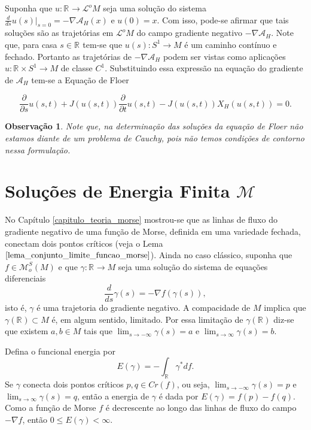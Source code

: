 \documentclass[12pt]{book}
\newtheorem{observacao}[teorema]{Observação}
\newcommand{\campohamiltoniano}[1]{X_{H}(#1)}
\newcommand{\circulo}{S^{1}}
\newcommand{\derivada}[2]{\frac{d #1}{d #2}}
\newcommand{\derivadaparcial}[2]{\frac{\partial #1}{\partial #2}}
\newcommand{\energiafinitaM}{\mathcal{M}}
\newcommand{\funcionalH}{\mathcal{A}_{H}}
\newcommand{\funcoesmorsesmale}[1]{\mathcal{M}^{S}_{o}(#1)}
\newcommand{\gradiente}{\nabla f}
\newcommand{\gradientefuncional}{\nabla \funcionalH}
\newcommand{\pontoscriticos}[1]{\textit{Cr}(#1)}
\newcommand{\retacartesianocirculo}{\real{} \times \circulo}
\newcommand{\real}[1]{\mathbb{R}^{#1}}
\newcommand{\reta}{\real{}}
\newcommand{\lacocontrateis}{\mathcal{L}^{o}M}
\begin{document}
	Suponha que $u :\reta\to \lacocontrateis$ seja uma solução do sistema $\derivada{}{s}u(s)|_{s=0} = -\gradientefuncional(x)$ e $u(0)=x$. Com isso, pode-se afirmar que tais soluções são as trajetórias em $\lacocontrateis$ do campo gradiente negativo $-\gradientefuncional$. Note que, para casa $s\in \reta$ tem-se que $u(s):\circulo\to M$ é um caminho contínuo e fechado. Portanto as trajetórias de $-\gradientefuncional$ podem ser vistas como aplicações $u:\retacartesianocirculo \to M$ de classe $C^{1}$. Substituindo essa expressão na equação do gradiente de $\funcionalH$ tem-se a Equação de Floer
	
	$$
	\derivadaparcial{}{s}u(s,t) + J(u(s,t))\derivadaparcial{}{t}u(s,t) -J(u(s,t)) \campohamiltoniano{u(s,t)}=0. 
	$$
	
	\begin{observacao}
		Note que, na determinação das soluções da equação de Floer não estamos diante de um problema de Cauchy, pois não temos condições de contorno nessa formulação.
	\end{observacao}
	
	\section{Soluções de Energia Finita $\energiafinitaM$}\label{secao_funcional_energia}
	
	No Capítulo \ref{capitulo_teoria_morse} mostrou-se que as linhas de fluxo do gradiente negativo de uma função de Morse, definida em uma variedade fechada, conectam dois pontos críticos (veja o Lema $\ref{lema_conjunto_limite_funcao_morse}$). Ainda no caso clássico, suponha que $f \in \funcoesmorsesmale{M}$ e que $\gamma:\reta \to M$ seja uma solução do sistema de equações diferenciais
	$$
	\derivada{}{s}\gamma(s)=-\gradiente(\gamma(s)),
	$$
	isto é, $\gamma$ é uma trajetoria do gradiente negativo. A compacidade de $M$ implica que $\gamma(\reta) \subset M$ é, em algum sentido, limitado. Por essa limitação de $\gamma(\reta)$ diz-se que existem $a, b \in M$ tais que $\lim_{s\to -\infty}\gamma(s)=a$ e $\lim_{s\to \infty}\gamma(s)=b$. 
	
	Defina o funcional energia por
	$$
	E(\gamma)= -\int_{\reta}\gamma^{*} df.
	$$
	Se $\gamma$ conecta dois pontos críticos $p,q\in \pontoscriticos{f}$, ou seja, $\lim_{s\to -\infty}\gamma(s)=p$ e $\lim_{s\to \infty}\gamma(s)=q$, então a energia de $\gamma$ é dada por $E(\gamma) = f(p) -f(q)$. Como a função de Morse $f$ é decrescente ao longo das linhas de fluxo do campo $-\gradiente$, então $0\leq E(\gamma)<\infty$.
	
\end{document}
